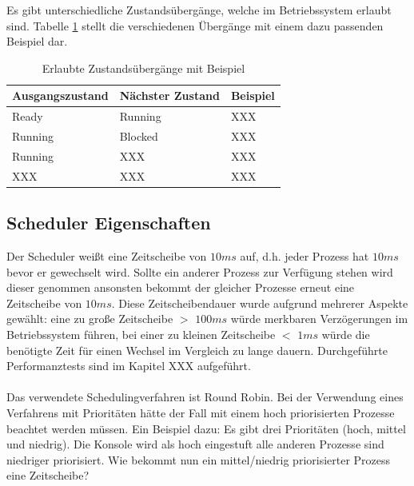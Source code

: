 Es gibt unterschiedliche Zustandsübergänge, welche im Betriebssystem erlaubt sind. Tabelle \ref{table:State-transition} stellt die verschiedenen Übergänge mit einem dazu passenden Beispiel dar.

\begin{table}[H]
\begin{tabular}{p{3cm} | p{3cm} | p{6cm}}
  \textbf{Ausgangszustand} & \textbf{Nächster Zustand} & \textbf{Beispiel} 
  \\ \hline
  Ready & Running & XXX \\
  Running & Blocked & XXX \\
  Running & XXX & XXX \\
  XXX & XXX & XXX \\
  
 \end{tabular}
 \caption{Erlaubte Zustandsübergänge mit Beispiel}
 \label{table:State-transition}
\end{table}

\subsection{Scheduler Eigenschaften}
Der Scheduler weißt eine Zeitscheibe von $10ms$ auf, d.h. jeder Prozess hat $10ms$ bevor er gewechselt wird. Sollte ein anderer Prozess zur Verfügung stehen wird dieser genommen ansonsten bekommt der gleicher Prozesse erneut eine Zeitscheibe von $10ms$. Diese Zeitscheibendauer wurde aufgrund mehrerer Aspekte gewählt: eine zu große Zeitscheibe $>$ $100ms$ würde merkbaren Verzögerungen im Betriebssystem führen, bei einer zu kleinen Zeitscheibe $<$ $1ms$ würde die benötigte Zeit für einen Wechsel im Vergleich zu lange dauern. Durchgeführte Performanztests sind im Kapitel XXX aufgeführt. \\ \\
Das verwendete Schedulingverfahren ist Round Robin. Bei der Verwendung eines Verfahrens mit Prioritäten hätte der Fall mit einem hoch priorisierten Prozesse beachtet werden müssen. Ein Beispiel dazu: Es gibt drei Prioritäten (hoch, mittel und niedrig). Die Konsole wird als hoch eingestuft alle anderen Prozesse sind niedriger priorisiert. Wie bekommt nun ein mittel/niedrig priorisierter Prozess eine Zeitscheibe?

\pagebreak 